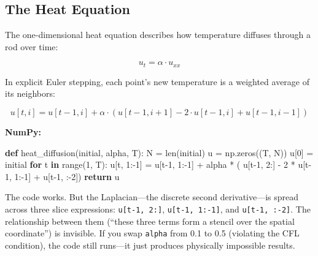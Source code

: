 \documentclass[11pt,titlepage]{article}
\newenvironment{Shaded}{}{}
\newcommand{\BuiltInTok}[1]{#1}
\newcommand{\ControlFlowTok}[1]{\textcolor[rgb]{0.00,0.44,0.13}{\textbf{#1}}}
\newcommand{\DecValTok}[1]{\textcolor[rgb]{0.25,0.63,0.44}{#1}}
\newcommand{\KeywordTok}[1]{\textcolor[rgb]{0.00,0.44,0.13}{\textbf{#1}}}
\newcommand{\NormalTok}[1]{#1}
\newcommand{\OperatorTok}[1]{\textcolor[rgb]{0.40,0.40,0.40}{#1}}
\begin{document}
\hypertarget{the-heat-equation}{%
\subsection{The Heat Equation}\label{the-heat-equation}}

The one-dimensional heat equation describes how temperature diffuses
through a rod over time:

\[u_t = \alpha \cdot u_{xx}\]

In explicit Euler stepping, each point's new temperature is a weighted
average of its neighbors:

\[u[t, i] = u[t-1, i] + \alpha \cdot (u[t-1, i+1] - 2 \cdot u[t-1, i] + u[t-1, i-1])\]

\textbf{NumPy:}

\begin{Shaded}
\begin{Highlighting}[]
\KeywordTok{def}\NormalTok{ heat_diffusion(initial, alpha, T):}
\NormalTok{    N }\OperatorTok{=} \BuiltInTok{len}\NormalTok{(initial)}
\NormalTok{    u }\OperatorTok{=}\NormalTok{ np.zeros((T, N))}
\NormalTok{    u[}\DecValTok{0}\NormalTok{] }\OperatorTok{=}\NormalTok{ initial}
    \ControlFlowTok{for}\NormalTok{ t }\KeywordTok{in} \BuiltInTok{range}\NormalTok{(}\DecValTok{1}\NormalTok{, T):}
\NormalTok{        u[t, }\DecValTok{1}\NormalTok{:}\OperatorTok{-}\DecValTok{1}\NormalTok{] }\OperatorTok{=}\NormalTok{ u[t}\DecValTok{-1}\NormalTok{, }\DecValTok{1}\NormalTok{:}\OperatorTok{-}\DecValTok{1}\NormalTok{] }\OperatorTok{+}\NormalTok{ alpha }\OperatorTok{*}\NormalTok{ (}
\NormalTok{            u[t}\DecValTok{-1}\NormalTok{, }\DecValTok{2}\NormalTok{:] }\OperatorTok{-} \DecValTok{2} \OperatorTok{*}\NormalTok{ u[t}\DecValTok{-1}\NormalTok{, }\DecValTok{1}\NormalTok{:}\OperatorTok{-}\DecValTok{1}\NormalTok{] }\OperatorTok{+}\NormalTok{ u[t}\DecValTok{-1}\NormalTok{, :}\OperatorTok{-}\DecValTok{2}\NormalTok{])}
    \ControlFlowTok{return}\NormalTok{ u}
\end{Highlighting}
\end{Shaded}

The code works. But the Laplacian---the discrete second derivative---is
spread across three slice expressions: \texttt{u{[}t-1,\ 2:{]}},
\texttt{u{[}t-1,\ 1:-1{]}}, and \texttt{u{[}t-1,\ :-2{]}}. The
relationship between them (``these three terms form a stencil over the
spatial coordinate'') is invisible. If you swap \texttt{alpha} from 0.1
to 0.5 (violating the CFL condition), the code still runs---it just
produces physically impossible results.
\end{document}
